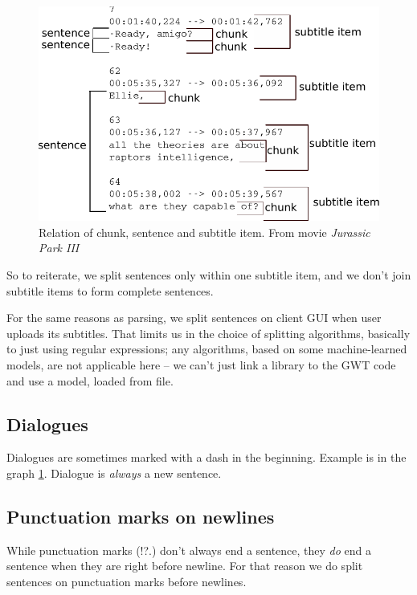 \begin{figure}[t]
\begin{center}
\includegraphics{figures/chunks.pdf}
\end{center}
\caption{Relation of chunk, sentence and subtitle item. From movie \emph{Jurassic Park III}}\label{splitting:chunks}
\end{figure}

So to reiterate, we split sentences only within one subtitle item, and we don't join subtitle items to form complete sentences.

For the same reasons as parsing, we split sentences on client GUI when user uploads its subtitles. That limits us in the choice of splitting algorithms, basically to just using regular expressions; any algorithms, based on some machine-learned models, are not applicable here -- we can't just link a library to the GWT code and use a model, loaded from file.

\subsection*{Dialogues}
Dialogues are sometimes marked with a dash in the beginning. Example is in the graph \ref{splitting:chunks}. Dialogue is \emph{always} a new sentence.

\subsection*{Punctuation marks on newlines}
While punctuation marks (!?.) don't always end a sentence, they \emph{do} end a sentence when they are right before newline. For that reason we do split sentences on punctuation marks before newlines.

